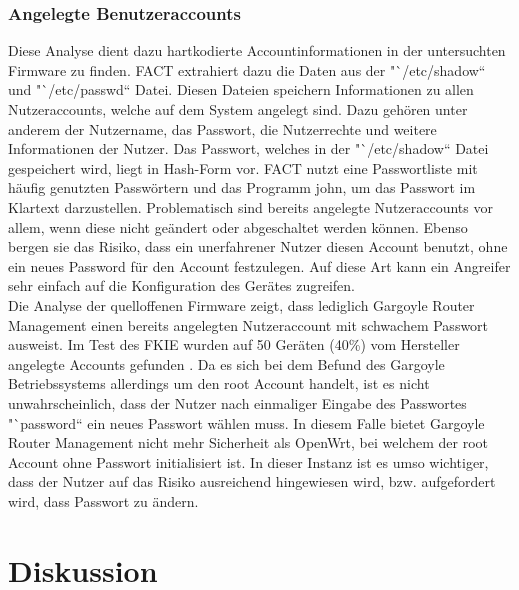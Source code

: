 \documentclass[a4paper]{book}
\begin{document}
\begin{large}
\subsection{Angelegte Benutzeraccounts}
\begin{onehalfspace}
Diese Analyse dient dazu hartkodierte Accountinformationen in der untersuchten Firmware zu finden. FACT extrahiert dazu die Daten aus der "`/etc/shadow“ und "`/etc/passwd“ Datei. Diesen Dateien speichern Informationen zu allen Nutzeraccounts, welche auf dem System angelegt sind. Dazu gehören unter anderem der Nutzername, das Passwort, die Nutzerrechte und weitere Informationen der Nutzer. Das Passwort, welches in der "`/etc/shadow“ Datei gespeichert wird, liegt in Hash-Form vor. FACT nutzt eine Passwortliste mit häufig genutzten Passwörtern und das Programm \glqq john\grqq{}, um das Passwort im Klartext darzustellen. Problematisch sind bereits angelegte Nutzeraccounts vor allem, wenn diese nicht geändert oder abgeschaltet werden können. Ebenso bergen sie das Risiko, dass ein unerfahrener Nutzer diesen Account benutzt, ohne ein neues Password für den Account festzulegen. Auf diese Art kann ein Angreifer sehr einfach auf die Konfiguration des Gerätes zugreifen. \\ \indent	
	Die Analyse der quelloffenen Firmware zeigt, dass lediglich Gargoyle Router Management einen bereits angelegten Nutzeraccount mit schwachem Passwort ausweist. Im Test des FKIE wurden auf 50 Geräten (40\%) vom Hersteller angelegte Accounts gefunden \cite[p.~19]{PeterWeidenbachJohannesvomDorp.2020}. Da es sich bei dem Befund des Gargoyle Betriebssystems allerdings um den root Account handelt, ist es nicht unwahrscheinlich, dass der Nutzer nach einmaliger Eingabe des Passwortes "`password“ ein neues Passwort wählen muss. In diesem Falle bietet Gargoyle Router Management nicht mehr Sicherheit als OpenWrt, bei welchem der root Account ohne Passwort initialisiert ist. In dieser Instanz ist es umso wichtiger, dass der Nutzer auf das Risiko ausreichend hingewiesen wird, bzw. aufgefordert wird, dass Passwort zu ändern.
\end{onehalfspace}



\chapter{Diskussion}
\label{discussion}

\end{large}
\end{document}
